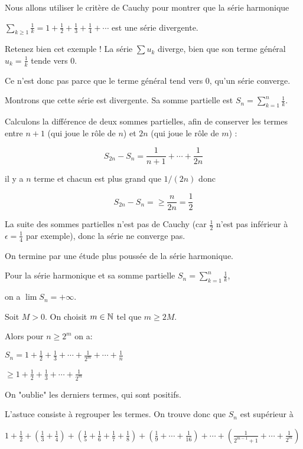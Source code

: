 Nous allons utiliser le critère de Cauchy pour montrer que la série harmonique 

$\displaystyle \sum_{k \ge 1} \frac{1}{k} = 1 + \frac12+\frac13+\frac14+\cdots$ est une série divergente.

\change
Retenez bien cet exemple !
La série  $\sum u_k$ diverge, bien que son terme général 
$u_k = \frac{1}{k} $ tende vers $0$.

Ce n'est donc pas parce que le terme général tend vers $0$, qu'un série converge.

\change
Montrons que cette série est divergente. Sa somme partielle est $S_n = \sum_{k=1}^{n} \frac{1}{k}$.

Calculons la différence de deux sommes partielles, afin de conserver 
les termes entre $n+1$ (qui joue le rôle de $n$)
et $2n$ (qui joue le rôle de $m$) :

\change
$$
S_{2n}-S_{n} = \frac{1}{n+1}+\cdots+\frac{1}{2n}$$

il y a $n$ terme et chacun est plus grand que $1/(2n)$
donc 

$$S_{2n}-S_{n} =\ge
\frac{n}{2n}=\frac{1}{2} 
$$

\change
La suite des sommes partielles n'est pas de Cauchy (car $\frac12$ 
n'est pas inférieur à $\epsilon = \frac14$ par exemple), 
donc la série ne converge pas.

\diapo

On termine par une étude plus poussée de la série harmonique.

Pour la série harmonique et sa somme partielle
$\displaystyle S_n = \sum_{k = 1}^n \frac{1}{k}$, 

on a $\lim S_n=+\infty.$

\change
Soit $M>0$. On choisit $m\in \mathbb{N}$ tel que $m\ge 2M$. 

\change
Alors pour $n\ge 2^m$ on a:

$S_n  =  1+\frac{1}{2}+\frac{1}{3}+\cdots+\frac{1}{2^m}+\cdots+ \frac{1}{n}$

\change
$\ge 1+\frac{1}{2}+\frac{1}{3}+\cdots+ \frac{1}{2^m}$

On "oublie" les derniers termes, qui sont positifs.


\change
L'astuce consiste à regrouper les termes. On trouve donc que $S_n$ est supérieur à 

$ 1 + \frac{1}{2}+ \left(\frac{1}{3}+\frac{1}{4}\right) 
  +\left(\frac{1}{5}+\frac{1}{6}+\frac{1}{7}+ \frac{1}{8}\right) +\left(\frac{1}{9}+\cdots +\frac{1}{16}\right)+  \cdots
+\left(\frac{1}{2^{m-1}+1}+\cdots + \frac{1}{2^m}\right)$

